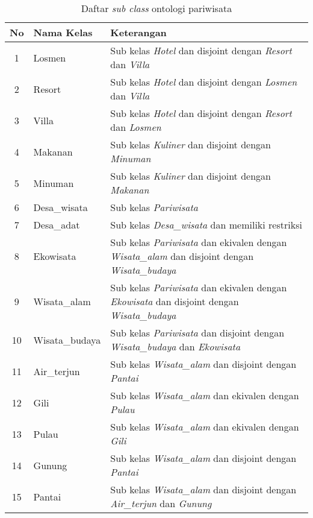 \begin{table}[tb]
	\caption{Daftar \emph{sub class} ontologi pariwisata}
	\label{tab:sub_class_ontopar}
	\centering

	\begin{tabularx}{\textwidth}{|c|l|X|}
	\hline

	\hline
	\textbf{No} & \textbf{Nama Kelas} & \textbf{Keterangan} \\
	\hline
		1 & Losmen & Sub kelas \emph{Hotel} dan disjoint dengan \emph{Resort} dan \emph{Villa}\\
	\hline
		2 & Resort & Sub kelas \emph{Hotel} dan disjoint dengan \emph{Losmen} dan \emph{Villa}\\
	\hline
		3 & Villa & Sub kelas \emph{Hotel} dan disjoint dengan \emph{Resort} dan \emph{Losmen}\\
	\hline
		4 & Makanan & Sub kelas \emph{Kuliner} dan disjoint dengan \emph{Minuman}\\
	\hline
		5 & Minuman & Sub kelas \emph{Kuliner} dan disjoint dengan \emph{Makanan}\\
	\hline
		6 & Desa\_wisata & Sub kelas \emph{Pariwisata}\\
	\hline
		7 & Desa\_adat & Sub kelas \emph{Desa\_wisata} dan memiliki restriksi\\
	\hline
		8 & Ekowisata & Sub kelas \emph{Pariwisata} dan ekivalen dengan \emph{Wisata\_alam} dan disjoint dengan \emph{Wisata\_budaya}\\
	\hline
		9 & Wisata\_alam & Sub kelas \emph{Pariwisata} dan ekivalen dengan \emph{Ekowisata} dan disjoint dengan \emph{Wisata\_budaya}\\
	\hline 
	   10 & Wisata\_budaya & Sub kelas \emph{Pariwisata} dan disjoint dengan \emph{Wisata\_budaya} dan \emph{Ekowisata}\\
	\hline
	   11 & Air\_terjun & Sub kelas \emph{Wisata\_alam} dan disjoint dengan \emph{Pantai}\\
	\hline
	   12 & Gili & Sub kelas \emph{Wisata\_alam} dan ekivalen dengan \emph{Pulau} \\
	\hline
	   13 & Pulau & Sub kelas \emph{Wisata\_alam} dan ekivalen dengan \emph{Gili}\\
	\hline 
	   14 & Gunung & Sub kelas \emph{Wisata\_alam} dan disjoint dengan \emph{Pantai}\\
	\hline
	   15 & Pantai & Sub kelas \emph{Wisata\_alam} dan disjoint dengan \emph{Air\_terjun} dan \emph{Gunung}\\
	\hline
	\end{tabularx}
\end{table}

